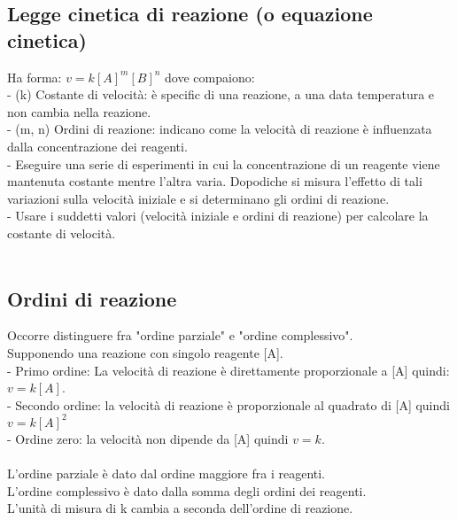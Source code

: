 \subsection{Legge cinetica di reazione (o equazione cinetica)}
Ha forma: $v = k [A]^m [B]^n$ dove compaiono:\\
\tab- (k) Costante di velocità: è specific di una reazione, a una data temperatura e non cambia nella reazione.\\
\tab- (m, n) Ordini di reazione: indicano come la velocità di reazione è influenzata dalla concentrazione dei reagenti.\\
\tab- Eseguire una serie di esperimenti in cui la concentrazione di un reagente viene mantenuta costante mentre l'altra varia. Dopodiche si misura l'effetto di tali variazioni sulla velocità iniziale e si determinano gli ordini di reazione.\\
\tab- Usare i suddetti valori (velocità iniziale e ordini di reazione) per calcolare la costante di velocità.\\\\
\subsection{Ordini di reazione}
Occorre distinguere fra "ordine parziale" e "ordine complessivo".\\
Supponendo una reazione con singolo reagente [A].\\
\tab- Primo ordine: La velocità di reazione è direttamente proporzionale a [A] quindi: $v = k[A]$.\\
\tab- Secondo ordine: la velocità di reazione è proporzionale al quadrato di [A] quindi $v = k[A]^2$\\
\tab- Ordine zero: la velocità non dipende da [A] quindi $v = k$.\\\\
L'ordine parziale è dato dal ordine maggiore fra i reagenti.\\
L'ordine complessivo è dato dalla somma degli ordini dei reagenti.\\
L'unità di misura di k cambia a seconda dell'ordine di reazione.\\
